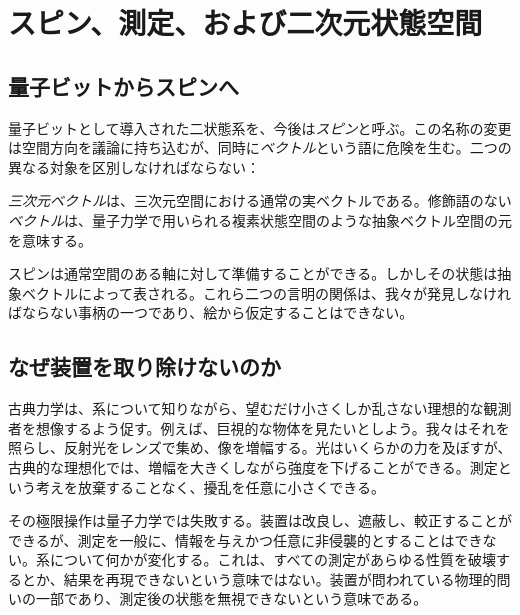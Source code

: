 \chapter{スピン、測定、および二次元状態空間}


\section{量子ビットからスピンへ}

量子ビットとして導入された二状態系を、今後は\emph{スピン}と呼ぶ。この名称の変更は空間方向を議論に持ち込むが、同時に\emph{ベクトル}という語に危険を生む。二つの異なる対象を区別しなければならない：

\begin{definition}
\emph{三次元ベクトル}は、三次元空間における通常の実ベクトルである。修飾語のない\emph{ベクトル}は、量子力学で用いられる複素状態空間のような抽象ベクトル空間の元を意味する。
\end{definition}

スピンは通常空間のある軸に対して準備することができる。しかしその状態は抽象ベクトルによって表される。これら二つの言明の関係は、我々が発見しなければならない事柄の一つであり、絵から仮定することはできない。

\section{なぜ装置を取り除けないのか}

古典力学は、系について知りながら、望むだけ小さくしか乱さない理想的な観測者を想像するよう促す。例えば、巨視的な物体を見たいとしよう。我々はそれを照らし、反射光をレンズで集め、像を増幅する。光はいくらかの力を及ぼすが、古典的な理想化では、増幅を大きくしながら強度を下げることができる。測定という考えを放棄することなく、擾乱を任意に小さくできる。

その極限操作は量子力学では失敗する。装置は改良し、遮蔽し、較正することができるが、測定を一般に、情報を与えかつ任意に非侵襲的とすることはできない。系について何かが変化する。これは、すべての測定があらゆる性質を破壊するとか、結果を再現できないという意味ではない。装置が問われている物理的問いの一部であり、測定後の状態を無視できないという意味である。

